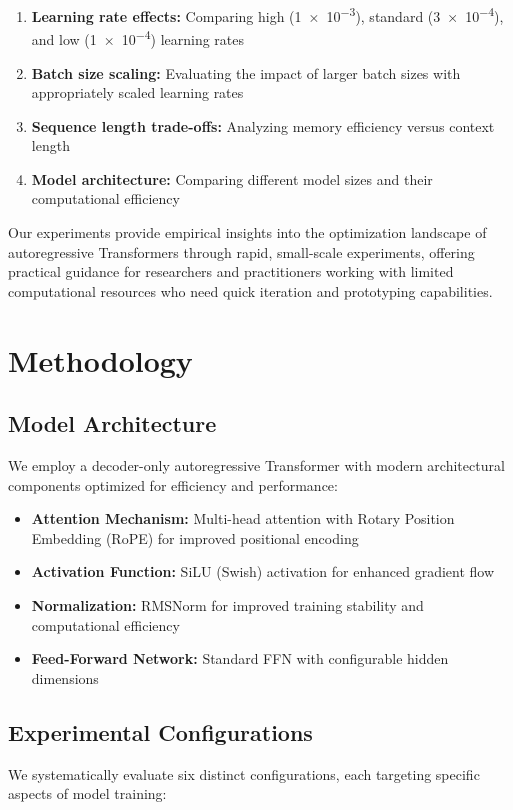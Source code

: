 \documentclass[11pt,a4paper]{article}
\begin{document}
\begin{enumerate}
    \item \textbf{Learning rate effects:} Comparing high (\num{1e-3}), standard (\num{3e-4}), and low (\num{1e-4}) learning rates
    \item \textbf{Batch size scaling:} Evaluating the impact of larger batch sizes with appropriately scaled learning rates
    \item \textbf{Sequence length trade-offs:} Analyzing memory efficiency versus context length
    \item \textbf{Model architecture:} Comparing different model sizes and their computational efficiency
\end{enumerate}

Our experiments provide empirical insights into the optimization landscape of autoregressive Transformers through rapid, small-scale experiments, offering practical guidance for researchers and practitioners working with limited computational resources who need quick iteration and prototyping capabilities.

\section{Methodology}

\subsection{Model Architecture}
We employ a decoder-only autoregressive Transformer with modern architectural components optimized for efficiency and performance:

\begin{itemize}
    \item \textbf{Attention Mechanism:} Multi-head attention with Rotary Position Embedding (RoPE) for improved positional encoding
    \item \textbf{Activation Function:} SiLU (Swish) activation for enhanced gradient flow
    \item \textbf{Normalization:} RMSNorm for improved training stability and computational efficiency
    \item \textbf{Feed-Forward Network:} Standard FFN with configurable hidden dimensions
\end{itemize}

\subsection{Experimental Configurations}
We systematically evaluate six distinct configurations, each targeting specific aspects of model training:
\end{document}
